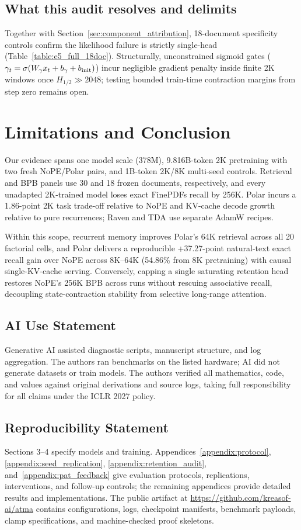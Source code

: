 \documentclass{article}
\newcommand{\rev}[1]{{\color{revcolor}#1}}
\newenvironment{revblock}{\color{revcolor}}{}
\begin{document}
\subsection{What this audit resolves and delimits}
\begin{revblock}
Together with Section~\ref{sec:component_attribution}, 18-document specificity controls confirm the likelihood failure is strictly single-head (Table~\ref{table:e5_full_18doc}). Structurally, unconstrained sigmoid gates ($\gamma_t=\sigma(W_\gamma x_t+b_\gamma+b_{\rm init})$) incur negligible gradient penalty inside finite 2K windows once $H_{1/2}\gg 2048$; testing bounded train-time contraction margins from step zero remains open.
\end{revblock}

\section{Limitations and Conclusion}
\rev{Our evidence spans one model scale (378M), 9.816B-token 2K pretraining with two fresh NoPE/Polar pairs, and 1B-token 2K/8K multi-seed controls.} Retrieval and BPB panels use 30 and 18 frozen documents, respectively, and every unadapted 2K-trained model loses exact FinePDFs recall by 256K. Polar incurs a 1.86-point 2K task trade-off relative to NoPE and KV-cache decode growth relative to pure recurrences; Raven and TDA use separate AdamW recipes.

Within this scope, recurrent memory improves Polar's 64K retrieval across all 20 factorial cells, \rev{and Polar delivers a reproducible +37.27-point natural-text exact recall gain over NoPE across 8K--64K (54.86\% from 8K pretraining) with causal single-KV-cache serving. Conversely, capping a single saturating retention head restores NoPE's 256K BPB across runs without rescuing associative recall, decoupling state-contraction stability from selective long-range attention.}

\subsection*{AI Use Statement}
Generative AI assisted diagnostic scripts, manuscript structure, and log aggregation. The authors ran benchmarks on the listed hardware; AI did not generate datasets or train models. The authors verified all mathematics, code, and values against original derivations and source logs, taking full responsibility for all claims under the ICLR 2027 policy.

\subsection*{Reproducibility Statement}
Sections 3--4 specify models and training. Appendices~\ref{appendix:protocol}, \ref{appendix:seed_replication}, \ref{appendix:retention_audit}, and~\ref{appendix:pat_feedback} give evaluation protocols, replications, interventions, and follow-up controls; the remaining appendices provide detailed results and implementations. The public artifact at \url{https://github.com/kreasof-ai/atma} contains configurations, logs, checkpoint manifests, benchmark payloads, clamp specifications, and machine-checked proof skeletons.

\clearpage



\appendix

\end{document}
